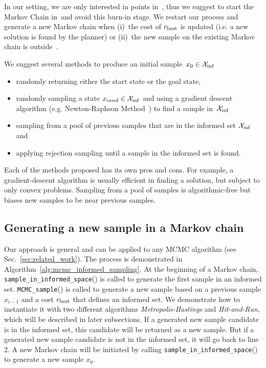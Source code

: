 \documentclass[letterpaper, 10 pt, conference]{ieeeconf}  %
\begin{document}
In our setting, we are only interested in points in~\Cinf, thus we suggest to start the Markov Chain in~\Cinf and avoid this burn-in stage. 
We restart our process and generate a new Markov chain  when 
(i)~the cost of $c_{\rm best}$ is updated (i.e. a new solution is found by the planner) or
(ii)~the new sample on the existing Markov chain is outside~\Cinf.

We suggest several methods to produce an initial sample~$x_0 \in \mathcal{X}_{\rm {inf}} $ 
\begin{itemize}
	\item randomly returning either the start state or the goal state,
	\item randomly sampling a state $x_{\text rand} \in \mathcal{X}_{\rm {inf}}$ and using a gradient descent algorithm (e.g. Newton-Raphson Method~\cite{RT06}) to find a sample in~$ \mathcal{X}_{\rm {inf}} $
	\item sampling from a pool of previous samples that are in the informed set $ \mathcal{X}_{\rm {inf}} $ and
	\item applying rejection sampling until a sample in the informed set is found.
\end{itemize}

Each of the methods proposed has its own pros and cons.
For example, a gradient-descent algorithm is usually efficient in finding a solution, but subject to only convex problems.
Sampling from a pool of samples is algorithmic-free but biases new samples to be near previous samples.


\subsection{Generating a new sample in a Markov chain}
\label{mcmc}

Our approach is general and can be applied to any MCMC algorithm (see Sec.~\ref{sec:related_work}).
The process is demonstrated in Algorithm~\ref{alg:mcmc_informed_sampling}.
At the beginning of a Markov chain, \texttt{sample\_in\_informed\_space}() is called to generate the first sample in an informed set.
\texttt{MCMC\_sample}() is called to generate a new sample based on a previous sample $ x_{i-1} $ and a cost $ c_{\rm best} $ that defines an informed set.
We demonstrate how to instantiate it with two different algorithms \emph{Metropolis-Hastings} and \emph{Hit-and-Run}, which will be described in later subsections.
If a generated new sample candidate is in the informed set, this candidate will be returned as a new sample.
But if a generated new sample candidate is not in the informed set, it will go back to line 2.
A new Markov chain will be initiated by calling \texttt{sample\_in\_informed\_space}() to generate a new sample $ x_0 $.
\end{document}
